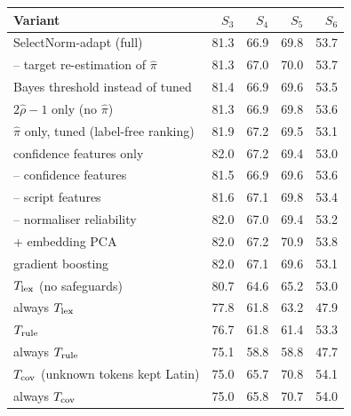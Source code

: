 \begin{tabular}{@{}lrrrr@{}}\toprule
Variant & $S_3$ & $S_4$ & $S_5$ & $S_6$\\\midrule
SelectNorm-adapt (full) & 81.3 & 66.9 & 69.8 & 53.7\\
\quad -- target re-estimation of $\hat\pi$ & 81.3 & 67.0 & 70.0 & 53.7\\
\quad Bayes threshold instead of tuned & 81.4 & 66.9 & 69.6 & 53.5\\
\quad $2\hat\rho-1$ only (no $\hat\pi$) & 81.3 & 66.9 & 69.8 & 53.6\\
\quad $\hat\pi$ only, tuned (label-free ranking) & 81.9 & 67.2 & 69.5 & 53.1\\
\quad confidence features only & 82.0 & 67.2 & 69.4 & 53.0\\
\quad -- confidence features & 81.5 & 66.9 & 69.6 & 53.6\\
\quad -- script features & 81.6 & 67.1 & 69.8 & 53.4\\
\quad -- normaliser reliability & 82.0 & 67.0 & 69.4 & 53.2\\
\quad + embedding PCA & 82.0 & 67.2 & 70.9 & 53.8\\
\quad gradient boosting & 82.0 & 67.1 & 69.6 & 53.1\\
\quad $T_{\rm lex}$ (no safeguards) & 80.7 & 64.6 & 65.2 & 53.0\\
\quad always $T_{\rm lex}$ & 77.8 & 61.8 & 63.2 & 47.9\\
\quad $T_{\rm rule}$ & 76.7 & 61.8 & 61.4 & 53.3\\
\quad always $T_{\rm rule}$ & 75.1 & 58.8 & 58.8 & 47.7\\
\quad $T_{\rm cov}$ (unknown tokens kept Latin) & 75.0 & 65.7 & 70.8 & 54.1\\
\quad always $T_{\rm cov}$ & 75.0 & 65.8 & 70.7 & 54.0\\
\bottomrule\end{tabular}
